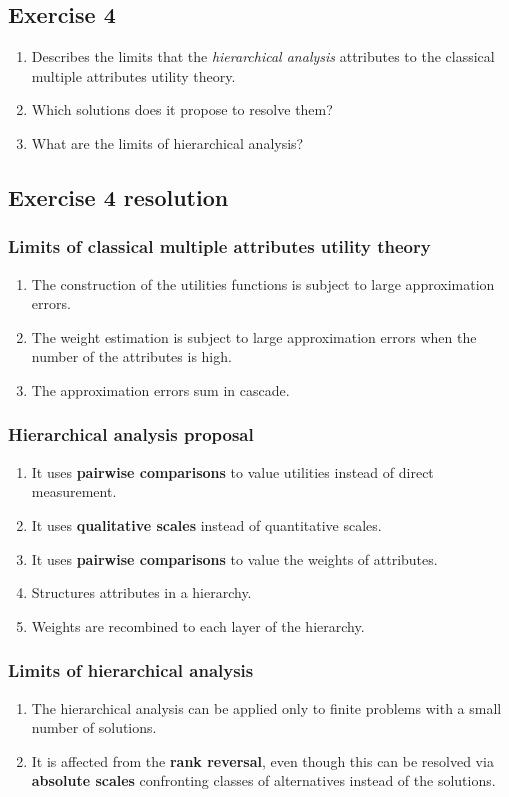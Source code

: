 \documentclass[\main/main.tex]{subfiles}
\begin{document}
\subsection{Exercise 4}
\begin{enumerate}
  \item Describes the limits that the \textit{hierarchical analysis} attributes to the classical multiple attributes utility theory.
  \item Which solutions does it propose to resolve them?
  \item What are the limits of hierarchical analysis?
\end{enumerate}

\subsection{Exercise 4 resolution}
\subsubsection*{Limits of classical multiple attributes utility theory}
\begin{enumerate}
  \item The construction of the utilities functions is subject to large approximation errors.
  \item The weight estimation is subject to large approximation errors when the number of the attributes is high.
  \item The approximation errors sum in cascade.
\end{enumerate}

\subsubsection*{Hierarchical analysis proposal}
\begin{enumerate}
  \item It uses \textbf{pairwise comparisons} to value utilities instead of direct measurement.
  \item It uses \textbf{qualitative scales} instead of quantitative scales.
  \item It uses \textbf{pairwise comparisons} to value the weights of attributes.
  \item Structures attributes in a hierarchy.
  \item Weights are recombined to each layer of the hierarchy.
\end{enumerate}

\subsubsection*{Limits of hierarchical analysis}
\begin{enumerate}
  \item The hierarchical analysis can be applied only to finite problems with a small number of solutions.
  \item It is affected from the \textbf{rank reversal}, even though this can be resolved via \textbf{absolute scales} confronting classes of alternatives instead of the solutions.
\end{enumerate}
\end{document}
